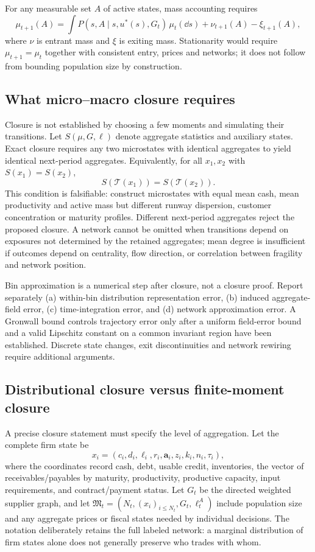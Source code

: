 \documentclass[11pt,a4paper]{article}
\begin{document}
For any measurable set $A$ of active states, mass accounting requires
\begin{equation}
\mu_{t+1}(A)=\int P(s,A\mid s,u^*(s),G_t)\,\mu_t(\dd s)+\nu_{t+1}(A)-\xi_{t+1}(A),
\label{eq:mass_balance}
\end{equation}
where $\nu$ is entrant mass and $\xi$ is exiting mass. Stationarity would require $\mu_{t+1}=\mu_t$ together with consistent entry, prices and networks; it does not follow from bounding population size by construction.

\subsection{What micro--macro closure requires}
Closure is not established by choosing a few moments and simulating their transitions. Let $S(\mu,G,\ell)$ denote aggregate statistics and auxiliary states. Exact closure requires any two microstates with identical aggregates to yield identical next-period aggregates. Equivalently, for all $x_1,x_2$ with $S(x_1)=S(x_2)$,
\begin{equation}
S(\mathcal T(x_1))=S(\mathcal T(x_2)).
\label{eq:fiber_test}
\end{equation}
This condition is falsifiable: construct microstates with equal mean cash, mean productivity and active mass but different runway dispersion, customer concentration or maturity profiles. Different next-period aggregates reject the proposed closure. A network cannot be omitted when transitions depend on exposures not determined by the retained aggregates; mean degree is insufficient if outcomes depend on centrality, flow direction, or correlation between fragility and network position.

Bin approximation is a numerical step after closure, not a closure proof. Report separately (a) within-bin distribution representation error, (b) induced aggregate-field error, (c) time-integration error, and (d) network approximation error. A Gronwall bound controls trajectory error only after a uniform field-error bound and a valid Lipschitz constant on a common invariant region have been established. Discrete state changes, exit discontinuities and network rewiring require additional arguments.

\subsection{Distributional closure versus finite-moment closure}
A precise closure statement must specify the level of aggregation. Let the complete firm state be
\[
x_i=(c_i,d_i,\ell_i,r_i,\mathbf a_i,z_i,k_i,n_i,\tau_i),
\]
where the coordinates record cash, debt, usable credit, inventories, the vector of receivables/payables by maturity, productivity, productive capacity, input requirements, and contract/payment status. Let $G_t$ be the directed weighted supplier graph, and let $\mathfrak M_t=(N_t,(x_i)_{i\leq N_t},G_t,\ell_t^A)$ include population size and any aggregate prices or fiscal states needed by individual decisions. The notation deliberately retains the full labeled network: a marginal distribution of firm states alone does not generally preserve who trades with whom.
\end{document}

